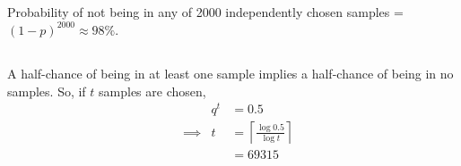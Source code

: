 \documentclass[twocolumn]{article}
\begin{document}
\subsection{} Probability of not being in any of 2000 independently chosen samples = $(1-p)^{2000} \approx 98\%$.
\subsection{} A half-chance of being in at least one sample implies a half-chance of being in no samples. So, if $t$ samples are chosen, \begin{align*}
&& q^t &= 0.5\\
&\implies & t&=\left\lceil \frac{\log 0.5}{\log t} \right\rceil\\
&&&=69315
\end{align*}
\end{document}
